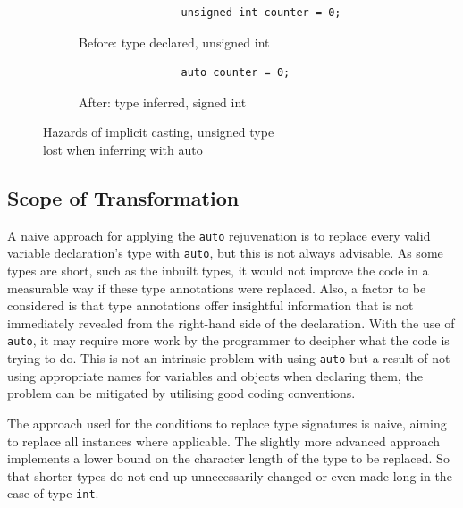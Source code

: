 \documentclass[bsc,frontabs,singlespacing,parskip,deptreport]{infthesis}
\begin{document}
\begin{figure}[!h]
    \centering
    \begin{subfigure}[h]{\textwidth}
        \centering
        \begin{verbatim}
                unsigned int counter = 0;
        \end{verbatim}
        \caption{Before: type declared, unsigned int}
        \label{fig:implicit-cast-before}
        \vspace{0.40cm}
    \end{subfigure}
    \begin{subfigure}[h]{\textwidth}
        \centering
        \begin{verbatim}
                auto counter = 0; 
        \end{verbatim}
        \caption{After: type inferred, signed int}
        \label{fig:implicit-cast-after}
    \end{subfigure}
    \caption{Hazards of implicit casting, unsigned type \\ lost when inferring with auto}
    \label{fig:implicit-cast}
\end{figure}

\subsection{Scope of Transformation}\label{sec:auto-scop-trans}
A naive approach for applying the \texttt{auto} rejuvenation is to replace every valid variable declaration's type with \texttt{auto}, but this is not always advisable. As some types are short, such as the inbuilt types, it would not improve the code in a measurable way if these type annotations were replaced. Also, a factor to be considered is that type annotations offer insightful information that is not immediately revealed from the right-hand side of the declaration. With the use of \texttt{auto}, it may require more work by the programmer to decipher what the code is trying to do. This is not an intrinsic problem with using \texttt{auto} but a result of not using appropriate names for variables and objects when declaring them, the problem can be mitigated by utilising good coding conventions. 

The approach used for the conditions to replace type signatures is naive, aiming to replace all instances where applicable. The slightly more advanced approach implements a lower bound on the character length of the type to be replaced. So that shorter types do not end up unnecessarily changed or even made long in the case of type \texttt{int}.
\end{document}
